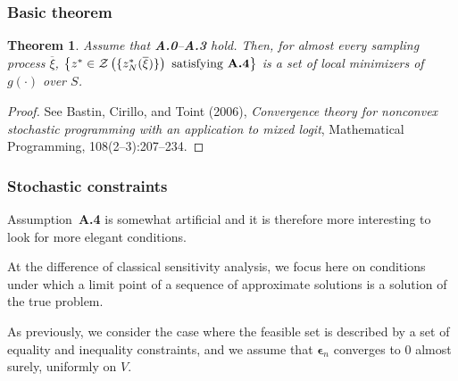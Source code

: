 \documentclass{beamer}
\newtheorem{theo}{Theorem}
\def\bepsilon{\boldsymbol\epsilon}
\begin{document}
\begin{frame}
\frametitle{Basic theorem}


\begin{theo}
\label{th:basic_second_order}
Assume that \textbf{A.0}--\textbf{A.3} hold.
Then, for almost every sampling process $\overline{\xi}$,
$\left \lbrace z^* \in \mathcal{Z}\left(\lbrace
    z^*_N(\overline{\xi})\rbrace\right) \text{ satisfying
    \textbf{A.4}} \right \rbrace$ is a set of local minimizers of $g(\cdot)$ over $S$.
\end{theo}

\begin{proof}
See Bastin, Cirillo, and Toint (2006), {\sl Convergence theory for
	nonconvex stochastic programming with an application to mixed logit},
Mathematical Programming, 108(2--3):207--234.
\end{proof}

\end{frame}

\begin{frame}
\frametitle{Stochastic constraints}

Assumption~\textbf{A.4} is somewhat artificial and it is therefore more interesting  to look for more elegant conditions.

\mbox{}

At the difference of classical sensitivity analysis, we focus here on conditions under which a limit point of a sequence of approximate solutions is a solution of the true problem.

\mbox{}

As previously, we consider the case where the feasible set is described by a set of equality and inequality constraints, and we assume that $\bepsilon_n$ converges to 0 almost surely, uniformly on $V$.

\end{frame}
\end{document}
